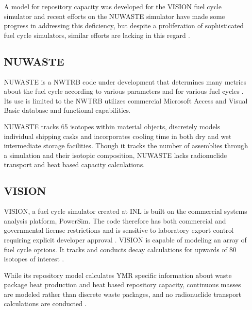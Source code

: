 A model for repository capacity was developed for the \gls{VISION} fuel cycle
simulator and recent efforts on the \gls{NUWASTE} simulator have made
some progress in addressing this deficiency, but despite a proliferation of
sophisticated fuel cycle simulators, similar efforts are lacking in this
regard \cite{yacout_visionverifiable_2006} \cite{radel_repository_2007} 
\cite{abkowitz_nuclear_2010}. 

\subsection{NUWASTE} 

\gls{NUWASTE} is a \acrlong{NWTRB} code under development 
that determines many metrics about the fuel cycle according to various
parameters and for various fuel cycles \cite{abkowitz_nuclear_2010}. Its use is 
limited to the \gls{NWTRB}  utilizes
commercial Microsoft Access and Visual Basic database and functional capabilities.  


\gls{NUWASTE} tracks 65 isotopes within 
material objects, discretely models individual shipping casks and incorporates 
cooling time in both dry and wet intermediate storage facilities. Though it 
tracks the number of assemblies through a simulation and their 
isotopic composition, \gls{NUWASTE} lacks radionuclide transport and heat based 
capacity calculations. 

\subsection{VISION} 

\gls{VISION}, a fuel cycle simulator created at \gls{INL} is built on the 
commercial systems analysis platform, PowerSim. The code therefore has both 
commercial and governmental license restrictions and is sensitive to 
laboratory export control requiring explicit developer approval 
\cite{yacout_daness_2011,van_den_durpel_daness:_2006}. \gls{VISION} is 
capable of modeling an array of fuel cycle options. It tracks and conducts 
decay calculations for upwards of 80 isotopes of interest 
\cite{yacout_visionverifiable_2006, wilson_comparing_2011}.

While its repository model calculates \gls{YMR} specific information 
about waste package heat production and heat based repository capacity, 
continuous masses are modeled rather than discrete  waste packages, and no 
radionuclide transport calculations are conducted  
\cite{radel_repository_2007} \cite{boucher_international_2010}.

